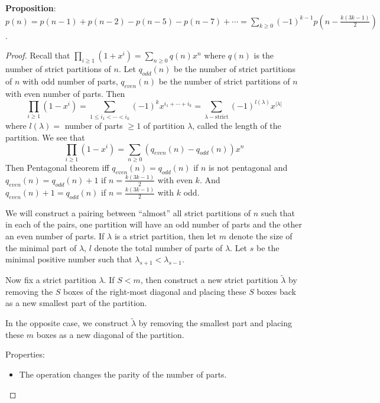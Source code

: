 \documentclass{report}
\begin{document}
\textbf{Proposition}: $p(n) = p(n - 1) + p(n -2) - p(n - 5) - p(n - 7) + \cdots  = \sum_{k \geq 0}(-1)^{k - 1}p(n - \frac{k(3k - 1)}{2})$.
    \begin{proof}
        Recall that $\prod_{i \geq 1}(1 + x^{i}) = \sum_{n \geq 0}q(n)x^{n}$ where $q(n)$ is the number of strict partitions of $n$. Let $q_{odd}(n)$ be the number of strict partitions of $n$ with odd number of parts, $q_{even}(n)$ be the number of strict partitions of $n$ with even number of parts. Then
            \begin{equation*}
                \prod_{i \geq 1}(1 - x^{i}) = \sum_{1 \leq i_{1} < \cdots < i_{k}}(-1)^{k}x^{i_{1} + \cdots +i_{k}} = \sum_{\lambda- \text{strict}}(-1)^{l(\lambda)}x^{\lvert \lambda \rvert}
            \end{equation*}
        where $l(\lambda)  = $ number of parts $\geq 1$ of partition $\lambda$, called the length of the partition. We see that 
            \begin{equation*}
                \prod_{i \geq 1}(1 - x^{i}) = \sum_{n \geq 0} (q_{even}(n) - q_{odd}(n))x^{n}
            \end{equation*}
        Then Pentagonal theorem iff $q_{even}(n) = q_{odd}(n)$ if $n$ is not pentagonal and $q_{even}(n) = q_{odd}(n) + 1$ if $n = \frac{k(3k - 1)}{2}$ with even $k$. And $q_{even}(n) + 1 = q_{odd}(n)$ if $n = \frac{k(3k - 1)}{2}$ with $k$ odd.

        We will construct a pairing between ``almost'' all strict partitions of $n$ such that in each of the pairs, one partition will have an odd number of parts and the other an even number of parts. If $\lambda$ is a strict partition, then let $m$ denote the size of the minimal part of $\lambda$, $l$ denote the total number of parts of $\lambda$. Let $s$ be the minimal positive number such that $\lambda_{s + 1} < \lambda_{s - 1}$.

        Now fix a strict partition $\lambda$. If $S < m$, then construct a new strict partition $\tilde{\lambda}$ by removing the $S$ boxes of the right-most diagonal and placing these $S$ boxes back as a new smallest part of the partition.

        In the opposite case, we construct $\tilde{\lambda}$ by removing the smallest part and placing these $m$ boxes as a new diagonal of the partition. 

        Properties: 
            \begin{itemize}
                \item The operation changes the parity of the number of parts.


\end{itemize}
\end{proof}
\end{document}
